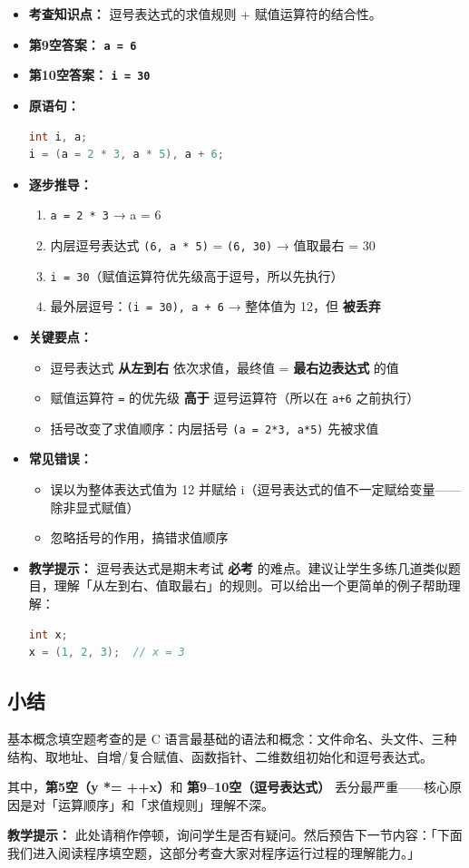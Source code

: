 \begin{itemize}
    \item \textbf{考查知识点：} 逗号表达式的求值规则 + 赋值运算符的结合性。
    \item \textbf{第9空答案：} \texttt{\textbf{a = 6}}
    \item \textbf{第10空答案：} \texttt{\textbf{i = 30}}
    \item \textbf{原语句：}
\begin{lstlisting}[language=C]
int i, a;
i = (a = 2 * 3, a * 5), a + 6;
\end{lstlisting}
    \item \textbf{逐步推导：}
    \begin{enumerate}
        \item \texttt{a = 2 * 3} → a = 6
        \item 内层逗号表达式 \texttt{(6, a * 5)} = \texttt{(6, 30)} → 值取最右 = 30
        \item \texttt{i = 30}（赋值运算符优先级高于逗号，所以先执行）
        \item 最外层逗号：\texttt{(i = 30), a + 6} → 整体值为 12，但 \textbf{被丢弃}
    \end{enumerate}
    \item \textbf{关键要点：}
    \begin{itemize}
        \item 逗号表达式 \textbf{从左到右} 依次求值，最终值 = \textbf{最右边表达式} 的值
        \item 赋值运算符 \texttt{=} 的优先级 \textbf{高于} 逗号运算符（所以在 \texttt{a+6} 之前执行）
        \item 括号改变了求值顺序：内层括号 \texttt{(a = 2*3, a*5)} 先被求值
    \end{itemize}
    \item \textbf{常见错误：}
    \begin{itemize}
        \item 误以为整体表达式值为 12 并赋给 i（逗号表达式的值不一定赋给变量——除非显式赋值）
        \item 忽略括号的作用，搞错求值顺序
    \end{itemize}
    \item \textbf{教学提示：} 逗号表达式是期末考试 \textbf{必考} 的难点。建议让学生多练几道类似题目，理解「从左到右、值取最右」的规则。可以给出一个更简单的例子帮助理解：
\begin{lstlisting}[language=C]
int x;
x = (1, 2, 3);  // x = 3
\end{lstlisting}
\end{itemize}

\subsection{小结}

基本概念填空题考查的是 C 语言最基础的语法和概念：文件命名、头文件、三种结构、取地址、自增/复合赋值、函数指针、二维数组初始化和逗号表达式。

其中，\textbf{第5空（y *= ++x）}和 \textbf{第9--10空（逗号表达式）} 丢分最严重——核心原因是对「运算顺序」和「求值规则」理解不深。

\textbf{教学提示：} 此处请稍作停顿，询问学生是否有疑问。然后预告下一节内容：「下面我们进入阅读程序填空题，这部分考查大家对程序运行过程的理解能力。」
